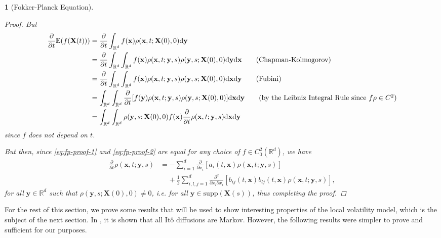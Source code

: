 \documentclass[english]{article}
\numberwithin{equation}{section}
\numberwithin{figure}{section}
\theoremstyle{bolddescit}
\newtheorem{theorem}{\protect\theoremname}[section]
\theoremstyle{definition}
\theoremstyle{definition}
\theoremstyle{plain}
\theoremstyle{plain}
\theoremstyle{bolddesc}
\theoremstyle{plain}
\theoremstyle{remark}
\providecommand{\theoremname}{Theorem}
\begin{document}
\begin{theorem}[Fokker-Planck Equation]
\begin{proof}
    But
    \begin{align}
      \frac{\partial}{\partial t}\mathbb{E}(f(\mathbf{X}(t)))
      &= \frac{\partial}{\partial t}\int_{\mathbb{R}^d} f(\mathbf{x}) \rho(\mathbf{x},t;\mathbf{X}(0),0) \mathrm{d}\mathbf{y}\notag\\
      &= \frac{\partial}{\partial t}\int_{\mathbb{R}^d} \int_{\mathbb{R}^d} f(\mathbf{x}) \rho(\mathbf{x},t;\mathbf{y},s) \rho(\mathbf{y},s;\mathbf{X}(0),0) \mathrm{d}\mathbf{y} \mathrm{d}\mathbf{x}\tag{Chapman-Kolmogorov}\\
      &= \frac{\partial}{\partial t}\int_{\mathbb{R}^d} \int_{\mathbb{R}^d} f(\mathbf{x}) \rho(\mathbf{x},t;\mathbf{y},s) \rho(\mathbf{y},s;\mathbf{X}(0),0) \mathrm{d}\mathbf{x} \mathrm{d}\mathbf{y}\tag{Fubini}\\
      &= \int_{\mathbb{R}^d} \int_{\mathbb{R}^d} \frac{\partial}{\partial t}[f(\mathbf{y}) \rho(\mathbf{x},t;\mathbf{y},s) \rho(\mathbf{y},s;\mathbf{X}(0),0)] \mathrm{d}\mathbf{x} \mathrm{d}\mathbf{y} \tag{by the Leibniz Integral Rule since $f\rho \in C^2$}\\
      &= \int_{\mathbb{R}^d}\int_{\mathbb{R}^d} \rho(\mathbf{y},s;\mathbf{X}(0),0) f(\mathbf{x}) \frac{\partial}{\partial t}\rho(\mathbf{x},t;\mathbf{y},s) \mathrm{d}\mathbf{x} \mathrm{d}\mathbf{y}\label{eq:fp-proof-2}
    \end{align}
    since $f$ does not depend on $t$.

    But then, since \eqref{eq:fp-proof-1} and \eqref{eq:fp-proof-2} are equal for any choice of $f \in C^2_0(\mathbb{R}^d)$, we have
    \begin{align*}
      \frac{\partial}{\partial t}\rho(\mathbf{x},t;\mathbf{y},s)
      &= - \sum_{i=1}^d \frac{\partial}{\partial x_i}[a_i(t,\mathbf{x}) \rho(\mathbf{x},t;\mathbf{y},s)]\\
        &\ \ \ \ \ + \frac{1}{2} \sum_{i,l,j=1}^{d} \frac{\partial^2}{\partial x_l \partial x_i}[b_{ij}(t,\mathbf{x}) b_{lj}(t,\mathbf{x}) \rho(\mathbf{x},t;\mathbf{y},s)],
    \end{align*}
    for all $\mathbf{y} \in \mathbb{R}^d$ such that $\rho(\mathbf{y},s;\mathbf{X}(0),0) \neq 0$, i.e. for all $\mathbf{y} \in \mathrm{supp}(\mathbf{X}(s))$, thus completing the proof.
  \end{proof}
\end{theorem}

For the rest of this section, we prove some results that will be used to show interesting properties of the local volatility model, which is the subject of the next section. In \textcite{oksendal_stochastic_2003}, it is shown that all It\^o diffusions are Markov. However, the following results were simpler to prove and sufficient for our purposes.
\end{document}
